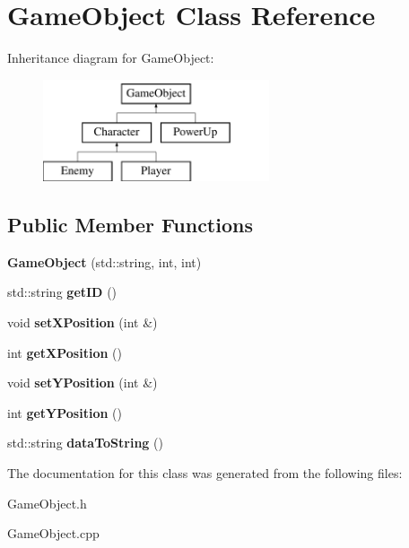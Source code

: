 \hypertarget{class_game_object}{}\section{Game\+Object Class Reference}
\label{class_game_object}
Inheritance diagram for Game\+Object\+:\begin{figure}[H]
\begin{center}
\leavevmode
\includegraphics[height=3.000000cm]{class_game_object}
\end{center}
\end{figure}
\subsection*{Public Member Functions}
\begin{DoxyCompactItemize}
\item 
\mbox{\label{class_game_object_adf9acb9e2d250f42f322d9b367eb7ff4}} 
{\bfseries Game\+Object} (std\+::string, int, int)
\item 
\mbox{\label{class_game_object_a54cb68b217bc51148649d10dc4f9bcbf}} 
std\+::string {\bfseries get\+ID} ()
\item 
\mbox{\label{class_game_object_accd8d02181c8a794a583ae5bb1bc1351}} 
void {\bfseries set\+X\+Position} (int \&)
\item 
\mbox{\label{class_game_object_ab5e682e5f30212535f21b00f7ac5aa7d}} 
int {\bfseries get\+X\+Position} ()
\item 
\mbox{\label{class_game_object_a8e561a36165c45b8eb48e898abca6024}} 
void {\bfseries set\+Y\+Position} (int \&)
\item 
\mbox{\label{class_game_object_a2c986fbc8dc62a1c187466a4ab48bebd}} 
int {\bfseries get\+Y\+Position} ()
\item 
\mbox{\label{class_game_object_af9bc07709ad106c507cccdef63d86254}} 
std\+::string {\bfseries data\+To\+String} ()
\end{DoxyCompactItemize}


The documentation for this class was generated from the following files\+:\begin{DoxyCompactItemize}
\item 
Game\+Object.\+h\item 
Game\+Object.\+cpp\end{DoxyCompactItemize}
